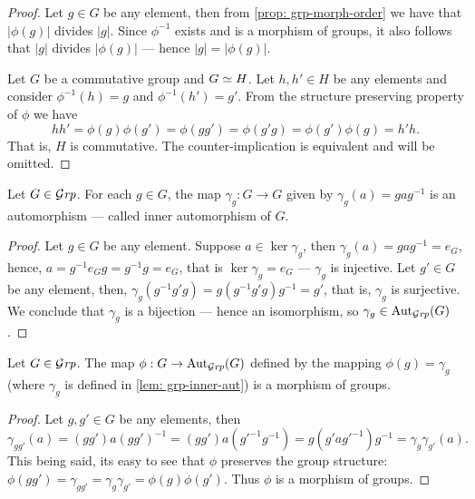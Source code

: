 \begin{proof}
  Let \(g \in G\) be any element, then from \cref{prop: grp-morph-order} we have
  that \(|\phi(g)|\) divides \(|g|\). Since \(\phi^{-1}\) exists and is a
  morphism of groups, it also follows that \(|g|\) divides \(|\phi(g)|\) ---
  hence \(|g| = |\phi(g)|\).

  Let \(G\) be a commutative group and \(G \simeq H\). Let \(h, h' \in H\) be any
  elements and consider \(\phi^{-1}(h) = g\) and \(\phi^{-1}(h') = g'\). From
  the structure preserving property of \(\phi\) we have
  \[
    h h' = \phi(g) \phi(g') = \phi(gg') = \phi(g'g) = \phi(g')\phi(g) = h' h.
  \]
  That is, \(H\) is commutative. The counter-implication is equivalent and will
  be omitted.
\end{proof}

\begin{lemma}\label{lem: grp-inner-aut}
  Let \(G \in {\mathcal{G}\textit{rp}}\). For each \(g \in G\), the map \(\gamma_g: G \to G\) given
  by \(\gamma_g(a) = gag^{-1}\) is an automorphism --- called inner
  automorphism of \(G\).
\end{lemma}

\begin{proof}
  Let \(g \in G\) be any element. Suppose \(a \in \ker\gamma_g\), then
  \(\gamma_g(a) = gag^{-1} = e_G\), hence, \(a = g^{-1} e_G g = g^{-1}g = e_G\),
  that is \(\ker\gamma_g = e_G\) --- \(\gamma_g\) is injective. Let \(g' \in G\)
  be any element, then, \(\gamma_g(g^{-1} g' g) = g (g^{-1} g' g) g^{-1} = g'\),
  that is, \(\gamma_g\) is surjective. We conclude that \(\gamma_g\) is a
  bijection --- hence an isomorphism, so \(\gamma_g \in \operatorname{Aut}_{\mathcal{G}\textit{rp}}(G)\).
\end{proof}

\begin{lemma}\label{lem: grp-inner-aut-cor}
  Let \(G \in {\mathcal{G}\textit{rp}}\). The map \(\phi: G \to \operatorname{Aut}_{\mathcal{G}\textit{rp}}(G)\) defined by the
  mapping \(\phi(g) = \gamma_g\) (where \(\gamma_g\) is defined in \cref{lem:
  grp-inner-aut}) is a morphism of groups.
\end{lemma}

\begin{proof}
  Let \(g, g' \in G\) be any elements, then
  \[
    \gamma_{gg'}(a) = (gg')a{(gg')}^{-1} = (g g') a (g'^{-1} g^{-1})
    = g(g' a g'^{-1}) g^{-1} = \gamma_g \gamma_{g'}(a).
  \]
  This being said, its easy to see that \(\phi\) preserves the group structure:
  \(\phi(gg') = \gamma_{gg'} = \gamma_g \gamma_{g'} = \phi(g) \phi(g')\). Thus
  \(\phi\) is a morphism of groups.
\end{proof}

